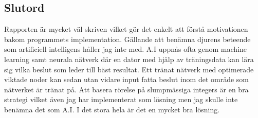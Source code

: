 \documentclass[hidelinks]{article}
\begin{document}
\subsection*{Slutord}
Rapporten är mycket väl skriven vilket gör det enkelt att förstå motivationen bakom programmets implementation. Gällande att benämna djurens beteende som artificiell intelligens
håller jag inte med. A.I uppnås ofta genom machine learning samt neurala nätverk där en dator med hjälp av träningsdata kan lära sig vilka beslut som leder till bäst resultat.
Ett tränat nätverk med optimerade viktade noder kan sedan utan vidare input fatta beslut inom det område som nätverket är tränat på. Att basera rörelse på slumpmässiga integers är en bra strategi
vilket även jag har implementerat som lösning men jag skulle inte benämna det som A.I.
I det stora hela är det en mycket bra lösning. 
\end{document}

